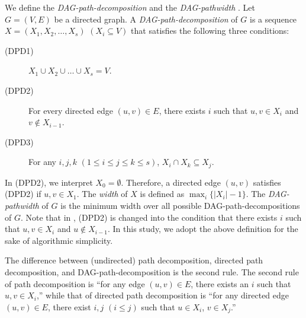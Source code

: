 \documentclass[runningheads]{llncs}
\theoremstyle{plain}
\theoremstyle{definition}
\begin{document}

We define the \emph{DAG-path-decomposition} and the \emph{DAG-pathwidth} \cite{art12}. Let $G = (V, E)$ be a directed graph. A \emph{DAG-path-decomposition} of $G$ is a sequence $X = (X_1, X_2, \dots, X_s)$ $(X_i \subseteq V)$ that satisfies the following three conditions:
\begin{description}
    \item[(DPD1)] $X_1 \cup X_2 \cup \dots \cup X_s = V$.
    \item[(DPD2)] For every directed edge $(u, v) \in E$, there exists $i$ such that $u, v \in X_i$ and $v \notin X_{i-1}$. \label{original_rule}
    \item[(DPD3)] For any $i, j, k$ $(1 \leq i \leq j \leq k \leq s)$, $X_i \cap X_k \subseteq X_j$. %
\end{description}
In (DPD2), we interpret $X_0 = \emptyset$. Therefore, a directed edge $(u, v)$ satisfies (DPD2) if $u, v \in X_1$. The \emph{width} of $X$ is defined as $\max_i \{ |X_i| - 1 \}$. The \emph{DAG-pathwidth} of $G$ is the minimum width over all possible DAG-path-decompositions of $G$. Note that in \cite{art12}, (DPD2) is changed into the condition that there exists $i$ such that $u, v \in X_i$ and $u \notin X_{i-1}$. In this study, we adopt the above definition for the sake of algorithmic simplicity.


The difference between (undirected) path decomposition,
directed path decomposition, and DAG-path-decomposition is the second rule. The second rule of path decomposition is ``for any edge $(u, v) \in E$, there exists an $i$ such that $u, v \in X_i$,''  while that of directed path decomposition is ``for any directed edge $(u, v) \in E$, there exist $i, j$ $(i \leq j)$ such that $u \in X_i$, $v \in X_j$.'' %
\end{document}
